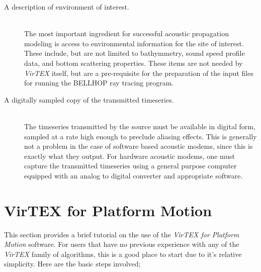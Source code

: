\documentclass[12pt, letterpaper, oneside]{article}
\begin{document}
\begin{description}
\item[A description of environment of interest.]\hfill \\
The most important ingredient for successful acoustic
propagation modeling is access to environmental information for the
site of interest. These include, but are not limited to bathymmetry,
sound speed profile data, and bottom scattering properties. These items
are not needed by {\em VirTEX} itself, but are a pre-requisite for
the preparation of the input files for running the
BELLHOP ray tracing program.

\item[A digitally sampled copy of the transmitted timeseries.]\hfill \\
The timeseries transmitted by the source must be available in
digital form, sampled at a rate high enough to preclude aliasing
effects.  This is generally not a problem in the case of software
based acoustic modems, since this is exactly what they output. For
hardware acoustic modems, one must capture the transmitted timeseries
using a general purpose computer equipped with an analog to digital
converter and appropriate software.
\end{description}

\section{VirTEX for Platform Motion}
This section provides a brief tutorial on the use of the {\em VirTEX for
Platform Motion} software. For users that have no previous experience
with any of the {\em VirTEX} family of algorithms, this is a good place
to start due to it's relative simplicity. Here are the basic steps
involved;
\end{document}
